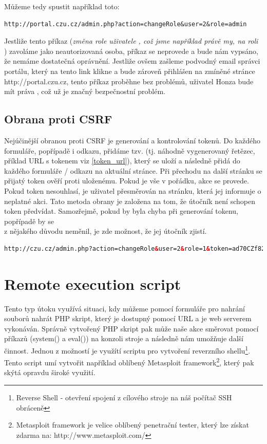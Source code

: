 \documentclass[12pt, a4paper]{report}
\begin{document}
Můžeme tedy spustit například toto:
\begin{lstlisting}[label=csfr_example1,caption=URL změny uživatelské role]
http://portal.czu.cz/admin.php?action=changeRole&user=2&role=admin
\end{lstlisting}

Jestliže tento příkaz (\textit{změna role uživatele , což jsme například právě my, na roli }) zavoláme jako neautorizovaná osoba, příkaz se neprovede a bude nám vypsáno, že nemáme dostatečná oprávnění. Jestliže ovšem zašleme podvodný email správci portálu, který na tento link klikne a bude zároveň přihlášen na zmíněné stránce {http://portal.czu.cz}, tento příkaz proběhne bez problémů, uživatel Honza bude mít práva , což už je značný bezpečnostní problém.

\subsection{Obrana proti CSRF}
Nejúčinější obranou proti CSRF je generování a kontrolování tokenů. Do každého formuláře, popřípadě i odkazu, přidáme tzv.  (tj. náhodně vygenerovaný řetězec, příklad URL s tokenem viz \ref{token_url}), který se uloží a následně přidá do každého formuláře / odkazu na aktuální stránce. Při přechodu na další stránku se přijatý token ověří proti uloženému. Pokud je vše v pořádku, akce se provede. Pokud token nesouhlasí, je uživatel přesměrován na  stránku, která jej informuje o neplatné akci. Tato metoda obrany je založena na tom, že útočník není schopen token předvídat. Samozřejmě, pokud by byla chyba při generování tokenu, popřípadě by se \\z nějakého důvodu neměnil, je zde možnost, že jej útočník zjistí.

\begin{lstlisting}[label=token_url,language=HTML, caption=CSRF obrana - token]
http://czu.cz/admin.php?action=changeRole&user=2&role=1&token=ad70CZf82
\end{lstlisting}

\section{Remote execution script}
Tento typ útoku využívá situaci, kdy můžeme pomocí formuláře pro nahrání souborů nahrát PHP skript, který je dostupný pomocí URL a je web serverem vykonáván. Správně vytvořený PHP skript pak může naše akce směrovat pomocí příkazů (system() a eval()) na konzoli stroje a následně nám umožňuje další činnost. Jednou z možností je využítí scriptu pro vytvoření reverzního shellu\footnote{Reverse Shell - otevření spojení z cílového stroje na náš počítač  SSH obráceně}. Tento script umí vytvořit například oblíbený Metasploit framework\footnote{Metasploit framework je velice oblíbený penetrační tester, který lze získat zdarma na: http://www.metasploit.com/}, který pak skýtá opravdu široké využití.
\end{document}
